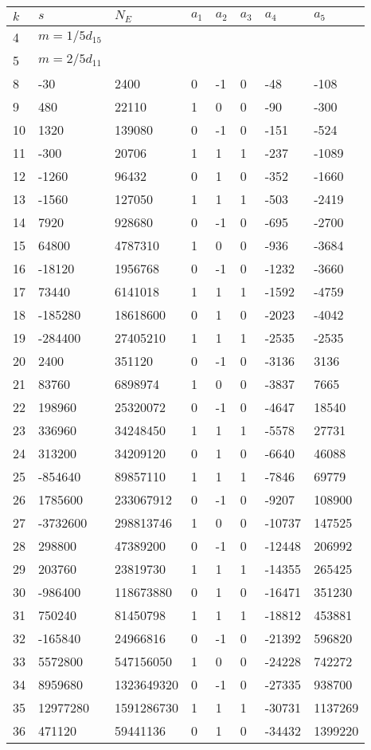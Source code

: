 \documentclass{amsart}
\begin{document}
\begin{longtable}{|l|l|l|lllll|}
\hline
$k$ & $s$ & $N_E$ & $a_1$ & $a_2$ & $a_3$ & $a_4$ & $a_5$\\
\hline
4&$m=1/5d_{15}$&&\multicolumn{5}{c|}{}\\
5&$m=2/5d_{11}$&&\multicolumn{5}{c|}{}\\
8&-30&2400&0&-1&0&-48&-108\\
9&480&22110&1&0&0&-90&-300\\
10&1320&139080&0&-1&0&-151&-524\\
11&-300&20706&1&1&1&-237&-1089\\
12&-1260&96432&0&1&0&-352&-1660\\
13&-1560&127050&1&1&1&-503&-2419\\
14&7920&928680&0&-1&0&-695&-2700\\
15&64800&4787310&1&0&0&-936&-3684\\
16&-18120&1956768&0&-1&0&-1232&-3660\\
17&73440&6141018&1&1&1&-1592&-4759\\
18&-185280&18618600&0&1&0&-2023&-4042\\
19&-284400&27405210&1&1&1&-2535&-2535\\
20&2400&351120&0&-1&0&-3136&3136\\
21&83760&6898974&1&0&0&-3837&7665\\
22&198960&25320072&0&-1&0&-4647&18540\\
23&336960&34248450&1&1&1&-5578&27731\\
24&313200&34209120&0&1&0&-6640&46088\\
25&-854640&89857110&1&1&1&-7846&69779\\
26&1785600&233067912&0&-1&0&-9207&108900\\
27&-3732600&298813746&1&0&0&-10737&147525\\
28&298800&47389200&0&-1&0&-12448&206992\\
29&203760&23819730&1&1&1&-14355&265425\\
30&-986400&118673880&0&1&0&-16471&351230\\
31&750240&81450798&1&1&1&-18812&453881\\
32&-165840&24966816&0&-1&0&-21392&596820\\
33&5572800&547156050&1&0&0&-24228&742272\\
34&8959680&1323649320&0&-1&0&-27335&938700\\
35&12977280&1591286730&1&1&1&-30731&1137269\\
36&471120&59441136&0&1&0&-34432&1399220\\

\end{longtable}
\end{document}
